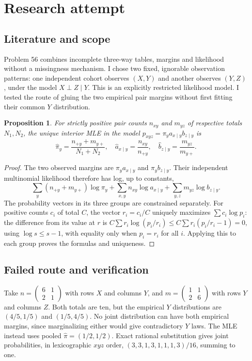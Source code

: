 \documentclass[11pt]{article}
\newtheorem{proposition}{Proposition}
\begin{document}
\section{Research attempt}
\subsection{Literature and scope}
Problem 56 combines incomplete three-way tables, margins and likelihood without a missingness mechanism. I chose two fixed, ignorable observation patterns: one independent cohort observes $(X,Y)$ and another observes $(Y,Z)$, under the model $X\perp Z\mid Y$. This is an explicitly restricted likelihood model. I tested the route of gluing the two empirical pair margins without first fitting their common $Y$ distribution.
\begin{proposition}
For strictly positive pair counts $n_{xy}$ and $m_{yz}$ of respective totals $N_1,N_2$, the unique interior MLE in the model $p_{xyz}=\pi_y a_{x\mid y}b_{z\mid y}$ is
\[
\widehat\pi_y=\frac{n_{+y}+m_{y+}}{N_1+N_2},\quad
\widehat a_{x\mid y}=\frac{n_{xy}}{n_{+y}},\quad
\widehat b_{z\mid y}=\frac{m_{yz}}{m_{y+}}.
\]
\end{proposition}
\begin{proof}
The two observed margins are $\pi_ya_{x\mid y}$ and $\pi_yb_{z\mid y}$. Their independent multinomial likelihood therefore has log, up to constants,
\[
\sum_y(n_{+y}+m_{y+})\log\pi_y+
\sum_{x,y}n_{xy}\log a_{x\mid y}+
\sum_{y,z}m_{yz}\log b_{z\mid y}.
\]
The probability vectors in its three groups are constrained separately. For positive counts $c_i$ of total $C$, the vector $r_i=c_i/C$ uniquely maximizes $\sum c_i\log p_i$: the difference from its value at $r$ is $C\sum r_i\log(p_i/r_i)\le C\sum r_i(p_i/r_i-1)=0$, using $\log s\le s-1$, with equality only when $p_i=r_i$ for all $i$. Applying this to each group proves the formulas and uniqueness.
\end{proof}
\subsection{Failed route and verification}
Take $n=\left(\begin{smallmatrix}6&1\\2&1\end{smallmatrix}\right)$ with rows $X$ and columns $Y$, and $m=\left(\begin{smallmatrix}1&1\\2&6\end{smallmatrix}\right)$ with rows $Y$ and columns $Z$. Both totals are ten, but the empirical $Y$ distributions are $(4/5,1/5)$ and $(1/5,4/5)$. No joint distribution can have both empirical margins, since marginalizing either would give contradictory $Y$ laws. The MLE instead uses pooled $\widehat\pi=(1/2,1/2)$. Exact rational substitution gives joint probabilities, in lexicographic $xyz$ order, $(3,3,1,3,1,1,1,3)/16$, summing to one.
\end{document}
